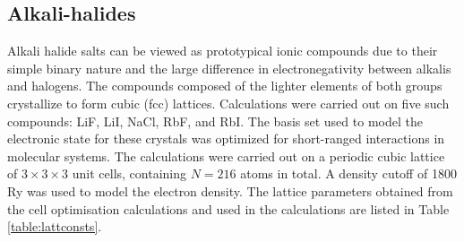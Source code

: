 \documentclass[aps,prb,twocolumn,amsmath,amssymb,superscriptaddress,longbibliography]{revtex4-1}
\begin{document}
 






\subsection*{Alkali-halides}


Alkali halide salts can be viewed as prototypical ionic compounds due to their simple binary nature and the large difference in electronegativity between alkalis and halogens. 
The compounds composed of the lighter elements of both groups crystallize to form cubic (fcc) lattices. 
Calculations were carried out on five such compounds: LiF, LiI, NaCl, RbF, and RbI. 
The basis set used to model the electronic state for these crystals was optimized for short-ranged interactions in molecular systems\cite{molopt}. 
The calculations were carried out on a periodic cubic lattice of $3 \times 3 \times 3$ unit cells, containing $N = 216$ atoms in total. 
A density cutoff of 1800 Ry was used to model the electron density.
The lattice parameters obtained from the cell optimisation calculations and used in the calculations are listed in Table \ref{table:lattconsts}.\\
\end{document}
